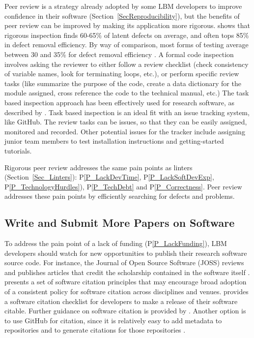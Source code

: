 \documentclass[final, 3p, times, authoryear]{elsarticle}
\newcommand{\ppref}[1]{P\ref{#1}}
\begin{document}
Peer review is a strategy already adopted by some LBM developers to improve
confidence in their software (Section~\ref{SecReproducibility}), but the
benefits of peer review can be improved by making its application more rigorous.
\citet{Jones2008} shows that rigorous inspection finds 60-65\% of latent defects
on average, and often tops 85\% in defect removal efficiency.  By way of
comparison, most forms of testing average between 30 and 35\% for defect removal
efficiency \citep{EbertAndJones2009, Jones2008}.  A formal code inspection
involves asking the reviewer to either follow a review checklist (check
consistency of variable names, look for terminating loops, etc.), or perform
specific review tasks (like summarize the purpose of the code, create a data
dictionary for the module assigned, cross reference the code to the technical
manual, etc.) The task based inspection approach has been effectively used for
research software, as described by \citet{KellyAndShepard2000}. Task based
inspection is an ideal fit with an issue tracking system, like GitHub.  The
review tasks can be issues, so that they can be easily assigned, monitored and
recorded.  Other potential issues for the tracker include assigning junior team
members to test installation instructions and getting-started tutorials.

Rigorous peer review addresses the same pain points as linters
(Section~\ref{Sec_Linters}): \ppref{P_LackDevTime}, \ppref{P_LackSoftDevExp},
\ppref{P_TechnologyHurdles}), \ppref{P_TechDebt} and \ppref{P_Correctness}. Peer
review addresses these pain points by efficiently searching for defects and
problems.

\subsection{Write and Submit More Papers on Software}

To address the pain point of a lack of funding (\ppref{P_LackFunding}), LBM
developers should watch for new opportunities to publish their research software
source code. For instance, the Journal of Open Source Software (JOSS) reviews
and publishes articles that credit the scholarship contained in the software
itself \citep{SmithEtAl2018-joss}.  \citep{SmithEtAl2016-softcite} presents a
set of software citation principles that may encourage broad adoption of a
consistent policy for software citation across disciplines and venues.
\citep{ChueHongEtAl2019} provides a software citation checklist for developers
to make a release of their software citable.  Further guidance on software
citation is provided by \citet{KatzEtAl2021}.  Another option is to use GitHub
for citation, since it is relatively easy to add metadata to repositories and to
generate citations for those repositories \citet{Smith2021-CitationsOnGitHub}.
\end{document}
